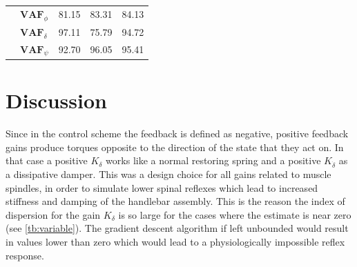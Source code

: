 \begin{table}[]
\begin{tabular}{llcccccc}
                                                   & $\mathbf{VAF}_\phi$                                    & \multicolumn{2}{c}{81.15}                                                                          & \multicolumn{2}{c}{83.31}                                                                          & \multicolumn{2}{c}{84.13}                                                                          \\
                                                   & $\mathbf{VAF}_\delta$                                  & \multicolumn{2}{c}{97.11}                                                                          & \multicolumn{2}{c}{75.79}                                                                          & \multicolumn{2}{c}{94.72}                                                                          \\
                                                   & $\mathbf{VAF}_\psi$                                    & \multicolumn{2}{c}{92.70}                                                                          & \multicolumn{2}{c}{96.05}                                                                          & \multicolumn{2}{c}{95.41}                                                                         
    \end{tabular}
    \end{table}
\section{Discussion}
 
Since in the control scheme the feedback is defined as negative, positive feedback gains produce torques opposite to the direction of the state that they act on. In that case a  positive \ensuremath{K_\delta} works like a normal restoring spring and  a positive \ensuremath{K_{\dot{\delta}}} as a dissipative damper. This was a design choice for all gains related to muscle spindles, in order to simulate lower spinal reflexes which  lead to increased stiffness and damping of the handlebar assembly. This is the reason the index of dispersion for the gain \ensuremath{K_\delta} is so large for the cases where the estimate is near zero (see \cref{tb:variable}). The gradient descent algorithm if left unbounded would result in values lower than zero which would lead to a physiologically impossible reflex response.  

